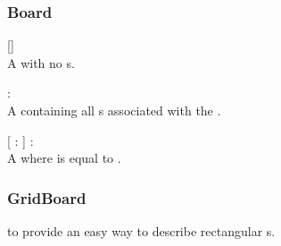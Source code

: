 \subsubsection{Board}
\begin{dlist}
  \item {}[]\\
  A  with no s.
  
  \item {} : \\
  A  containing all s associated with the .
  
  \item {}[  :  ] : \\
  A  where  is equal to .
\end{dlist}

\subsubsection{GridBoard}
   to provide an easy way to
describe rectangular s.

